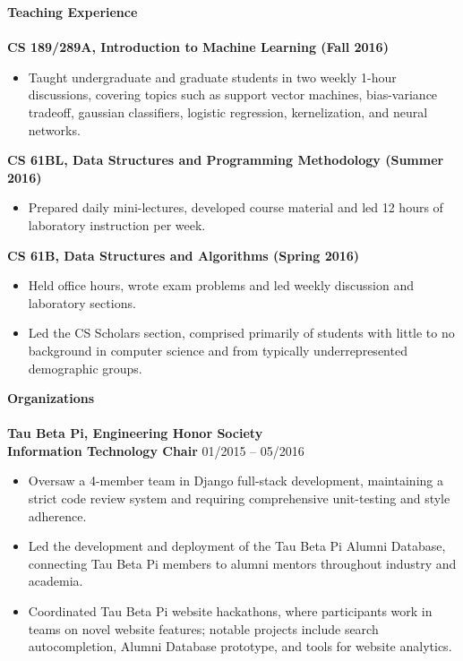 \documentclass{article}
\begin{document}
\noindent
\textbf{{\Large Teaching Experience}}\\[-2mm]
\HRule\\
\textbf{CS 189/289A, Introduction to Machine Learning (Fall 2016)}
\begin{itemize}
\vspace{-2.5mm}
\item Taught undergraduate and graduate students in two weekly 1-hour discussions, covering topics such as support vector machines, bias-variance tradeoff, gaussian classifiers, logistic regression, kernelization, and neural networks.
\end{itemize}
\vspace{-2mm}
\textbf{CS 61BL, Data Structures and Programming Methodology (Summer 2016)}
\begin{itemize}
\vspace{-2.5mm}
\item Prepared daily mini-lectures, developed course material and led 12 hours of laboratory instruction per week.
\end{itemize}
\vspace{-2mm}
\textbf{CS 61B, Data Structures and Algorithms (Spring 2016)}
\begin{itemize}
\vspace{-2.5mm}
\item Held office hours, wrote exam problems and led weekly discussion and laboratory sections.
\vspace{-2.5mm}
\item Led the CS Scholars section, comprised primarily of students with little to no background in computer science and from typically underrepresented demographic groups.
\end{itemize}
\newpage

\noindent
\textbf{{\Large Organizations}}\\[-2mm]
\HRule\\
\textbf{Tau Beta Pi, Engineering Honor Society} \\
\textbf{Information Technology Chair}
\hfill 01/2015 -- 05/2016
\begin{itemize}
\vspace{-2.5mm}
\item Oversaw a 4-member team in Django full-stack development, maintaining a strict code review system and requiring comprehensive unit-testing and style adherence.
\vspace{-2.5mm}
\item Led the development and deployment of the Tau Beta Pi Alumni Database, connecting Tau Beta Pi members to alumni mentors throughout industry and academia.
\vspace{-2.5mm}
\item Coordinated Tau Beta Pi website hackathons, where participants work in teams on novel website features; notable projects include search autocompletion, Alumni Database prototype, and tools for website analytics.
\end{itemize}
\vspace{-2mm}
\end{document}
